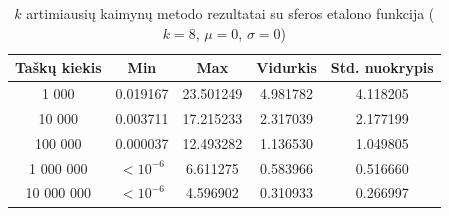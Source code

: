 \begin{table}[H]
    \centering
    \begin{tabular}{|c|c|c|c|c|}
        \hline
        \textbf{Taškų kiekis} & \textbf{Min} & \textbf{Max} & \textbf{Vidurkis} & \textbf{Std. nuokrypis} \\ \hline
        1 000        & 0.019167 & 23.501249 & 4.981782 & 4.118205 \\ \hline
        10 000       & 0.003711 & 17.215233 & 2.317039 & 2.177199 \\ \hline
        100 000      & 0.000037 & 12.493282 & 1.136530 & 1.049805 \\ \hline
        1 000 000    & $<10^{-6}$ & 6.611275 & 0.583966 & 0.516660 \\ \hline
        10 000 000   & $<10^{-6}$ & 4.596902 & 0.310933 & 0.266997 \\ \hline
    \end{tabular}
    \caption{$k$ artimiausių kaimynų metodo rezultatai su sferos etalono funkcija ($k = 8$, $\mu = 0$, $\sigma = 0$)}
\end{table}